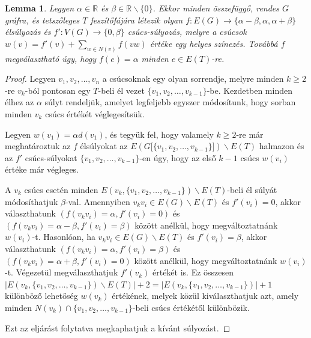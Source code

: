 \documentclass[12pt, a4paper]{report}
\newtheorem{lem}[tét]{Lemma}
\theoremstyle{remark}
\theoremstyle{definition}
\begin{document}
\begin{lem} \label{lem:edge6treemixed}
Legyen $\alpha \in \mathbb{R}$ és $\beta \in \mathbb{R} \smallsetminus \lbrace 0 \rbrace$. Ekkor minden összefüggő, rendes $G$ gráfra, és tetszőleges $T$ feszítőfájára létezik olyan $f:E(G) \rightarrow \lbrace \alpha - \beta, \alpha, \alpha + \beta \rbrace$ élsúlyozás és $f':V(G) \rightarrow \lbrace 0, \beta \rbrace$ csúcs-súlyozás, melyre a csúcsok $w(v) = f'(v) + \sum\limits_{w \in N(v)} f(vw)$ értéke egy helyes színezés. Továbbá $f$ megválasztható úgy, hogy $f(e) = \alpha$ minden $e \in E(T)$-re.
\end{lem}

\begin{proof}
Legyen $v_1, v_2, \ldots, v_n$ a csúcsoknak egy olyan sorrendje, melyre minden $k \geq 2$-re $v_k$-ból pontosan egy $T$-beli él vezet $\lbrace v_1, v_2, \ldots, v_{k - 1} \rbrace$-be. Kezdetben minden élhez az $\alpha$ súlyt rendeljük, amelyet legfeljebb egyszer módosítunk, hogy sorban minden $v_k$ csúcs értékét véglegesítsük.

Legyen $w(v_1) = \alpha d(v_1)$, és tegyük fel, hogy valamely $k \geq 2$-re már meghatároztuk az $f$ élsúlyokat az $E(G\lbrack \lbrace v_1, v_2, \ldots, v_{k - 1} \rbrace \rbrack) \smallsetminus E(T)$ halmazon és az $f'$ csúcs-súlyokat $\lbrace v_1, v_2, \ldots, v_{k - 1} \rbrace$-en úgy, hogy az első $k - 1$ csúcs $w(v_i)$ értéke már végleges.

A $v_k$ csúcs esetén minden $E(v_k, \lbrace v_1, v_2, \ldots, v_{k - 1} \rbrace) \smallsetminus E(T)$-beli él súlyát módosíthatjuk $\beta$-val. Amennyiben $v_k v_i \in E(G) \smallsetminus E(T)$ és $f'(v_i) = 0$, akkor választhatunk $(f(v_k v_i) = \alpha, f'(v_i) = 0)$ és $(f(v_k v_i) = \alpha - \beta, f'(v_i) = \beta)$ között anélkül, hogy megváltoztatnánk $w(v_i)$-t. Hasonlóan, ha $v_k v_i \in E(G) \smallsetminus E(T)$ és $f'(v_i) = \beta$, akkor választhatunk $(f(v_k v_i) = \alpha, f'(v_i) = \beta)$ és $(f(v_k v_i) = \alpha + \beta, f'(v_i) = 0)$ között anélkül, hogy megváltoztatnánk $w(v_i)$-t. Végezetül megválaszthatjuk $f'(v_k)$ értékét is. Ez összesen $|E(v_k, \lbrace v_1, v_2, \ldots, v_{k - 1} \rbrace) \smallsetminus E(T)| + 2 = |E(v_k, \lbrace v_1, v_2, \ldots, v_{k - 1} \rbrace)| + 1$ különböző lehetőség $w(v_k)$ értékének, melyek közül kiválaszthatjuk azt, amely minden $N(v_k) \cap \lbrace v_1, v_2, \ldots, v_{k - 1} \rbrace$-beli csúcs értékétől különbözik.

Ezt az eljárást folytatva megkaphatjuk a kívánt súlyozást.
\end{proof}
\end{document}

